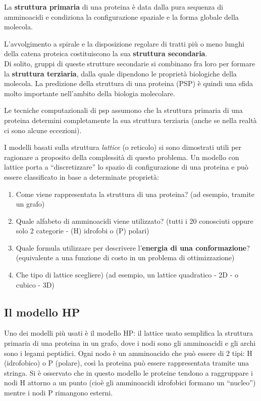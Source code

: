 \documentclass[twocolumn,10pt]{asme2ej}
\begin{document}
La \textbf{struttura primaria} di una proteina è data dalla pura sequenza di amminoacidi e condiziona la configurazione spaziale e la forma globale della molecola.

L'avvolgimento a spirale e la disposizione regolare di tratti più o meno lunghi della catena proteica costituiscono la sua \textbf{struttura secondaria}.\\

Di solito, gruppi di queste strutture secondarie si combinano fra loro per formare la \textbf{struttura terziaria}, dalla quale dipendono le proprietà biologiche della molecola. La predizione della struttura di una proteina (PSP) è quindi una sfida molto importante nell'ambito della biologia molecolare.

Le tecniche computazionali di psp assumono che la struttura primaria di una proteina determini completamente la sua struttura terziaria (anche se nella realtà ci sono alcune eccezioni).

I modelli basati sulla struttura \textit{lattice} (o reticolo) si sono dimostrati utili per ragionare a proposito della complessità di questo problema. Un modello con lattice porta a ``discretizzare'' lo spazio di configurazione di una proteina e può essere classificato in base a determinate proprietà:

\begin{enumerate}
 \item Come viene rappresentata la struttura di una proteina? (ad esempio, tramite un grafo)
 \item Quale alfabeto di amminoacidi viene utilizzato? (tutti i 20 conosciuti oppure solo 2 categorie - (H) idrofobi o (P) polari)
 \item Quale formula utilizzare per descrivere l'\textbf{energia di una conformazione}? (equivalente a una funzione di costo in un problema di ottimizzazione)
 \item Che tipo di lattice scegliere) (ad esempio, un lattice quadratico - 2D - o cubico - 3D)
\end{enumerate}

\subsection{Il modello HP}

Uno dei modelli più usati è il modello HP: il lattice usato semplifica la struttura primaria di una proteina in un grafo, dove i nodi sono gli amminoacidi e gli archi sono i legami peptidici. Ogni nodo è un amminoacido che può essere di 2 tipi: H (idrofobico) o P (polare), così la proteina può essere rappresentata tramite una stringa. Si è osservato che in questo modello le proteine tendono a raggruppare i nodi H attorno a un punto (cioè gli amminoacidi idrofobici formano un ``nucleo'') mentre i nodi P rimangono esterni.
\end{document}

